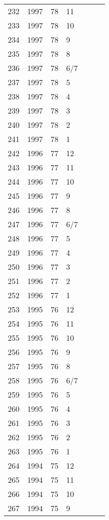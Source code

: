 \begin{longtable}{ |l|l|l|l|l|l|l| }
232 & 1997 & 78 & 11 &  &  &  \\
233 & 1997 & 78 & 10 &  &  &  \\
234 & 1997 & 78 & 9 &  &  &  \\
235 & 1997 & 78 & 8 &  &  &  \\
236 & 1997 & 78 & 6/7 &  &  &  \\
237 & 1997 & 78 & 5 &  &  &  \\
238 & 1997 & 78 & 4 &  &  &  \\
239 & 1997 & 78 & 3 &  &  &  \\
240 & 1997 & 78 & 2 &  &  &  \\
241 & 1997 & 78 & 1 &  &  &  \\
242 & 1996 & 77 & 12 &  &  &  \\
243 & 1996 & 77 & 11 &  &  &  \\
244 & 1996 & 77 & 10 &  &  &  \\
245 & 1996 & 77 & 9 &  &  &  \\
246 & 1996 & 77 & 8 &  &  &  \\
247 & 1996 & 77 & 6/7 &  &  &  \\
248 & 1996 & 77 & 5 &  &  &  \\
249 & 1996 & 77 & 4 &  &  &  \\
250 & 1996 & 77 & 3 &  &  &  \\
251 & 1996 & 77 & 2 &  &  &  \\
252 & 1996 & 77 & 1 &  &  &  \\
253 & 1995 & 76 & 12 &  &  &  \\
254 & 1995 & 76 & 11 &  &  &  \\
255 & 1995 & 76 & 10 &  &  &  \\
256 & 1995 & 76 & 9 &  &  &  \\
257 & 1995 & 76 & 8 &  &  &  \\
258 & 1995 & 76 & 6/7 &  &  &  \\
259 & 1995 & 76 & 5 &  &  &  \\
260 & 1995 & 76 & 4 &  &  &  \\
261 & 1995 & 76 & 3 &  &  &  \\
262 & 1995 & 76 & 2 &  &  &  \\
263 & 1995 & 76 & 1 &  &  &  \\
264 & 1994 & 75 & 12 &  &  &  \\
265 & 1994 & 75 & 11 &  &  &  \\
266 & 1994 & 75 & 10 &  &  &  \\
267 & 1994 & 75 & 9 &  &  &  \\

\end{longtable}
